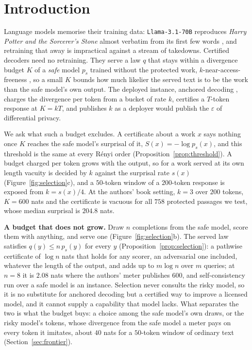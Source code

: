 
\section{Introduction}\label{sec:intro}

Language models memorise their training data: \texttt{Llama-3.1-70B} reproduces \emph{Harry Potter and the Sorcerer's Stone} almost verbatim
from its first few words \citep{cooper2025extracting}, and
retraining that away is impractical against a stream of takedowns. Certified decoders need no
retraining. They serve a law $q$ that stays within a divergence budget $K$ of a \emph{safe} model $p_s$
trained without the protected work, $k$-near-access-freeness \citep{vyas2023provable}, so a small $K$
bounds how much likelier the served text is to be the work than the safe model's own output. The
deployed instance, anchored decoding \citep{he2026anchored}, charges the divergence per token from a
bucket of rate $k$, certifies a $T$-token response at $K = kT$, and publishes $k$ as a deployer would
publish the $\varepsilon$ of differential privacy.

We ask what such a budget excludes. A certificate about a work $x$ says nothing once $K$ reaches the safe
model's surprisal of it, $S(x) = -\log p_s(x)$, and this threshold is the same at every R\'enyi order
(Proposition~\ref{prop:threshold}). A budget charged per token grows with the output, so for a work served
at its own length vacuity is decided by $k$ against the surprisal rate $s(x)$
(Figure~\ref{fig:selection}c), and a $50$-token window of a $200$-token response is exposed from
$k = s(x)/4$. At the authors' book setting, $k=3$ over $200$ tokens, $K = 600$ nats and the certificate is
vacuous for all $758$ protected passages we test, whose median surprisal is $204.8$ nats.

\textbf{A budget that does not grow.} Draw $n$ completions from the safe model, score them with
anything, and serve one (Figure~\ref{fig:selection}b). The served law satisfies $q(y) \le n\,p_s(y)$ for
every $y$ (Proposition~\ref{prop:selection}): a pathwise certificate of $\log n$ nats that holds for any
scorer, an adversarial one included, whatever the length of the output, and adds up to $m \log n$ over $m$
queries; at $n=8$ it is $2.08$ nats where the authors' meter publishes $600$, and self-consistency
\citep{wang2023selfconsistency} run over a safe model is an instance. Selection never consults the risky
model, so it is no substitute for anchored decoding but a certified way to improve a licensed model, and it
cannot supply a capability that model lacks. What separates the two is what the budget
buys: a choice among the safe model's own draws, or the risky model's tokens, whose divergence from the
safe model a meter pays on every token it imitates, about $40$ nats for a $50$-token window of ordinary
text (Section~\ref{sec:frontier}).

